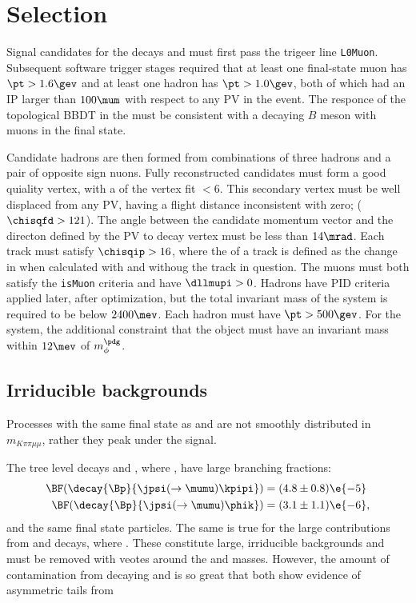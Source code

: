 \section{Selection}

Signal candidates for the decays \btokpipimumu and \btophikmumu must first pass the \lone trigeer
line {\tt L0Muon}.
Subsequent software trigger stages required that at least one final-state muon has $\pt>1.6\gev$
and at least one hadron has $\pt>1.0\gev$, both of which had an IP larger than $100\mum$ with
respect to any PV in the event.
The responce of the topological BBDT in the \hlttwo must be consistent with a decaying $B$ meson
with muons in the final state.


Candidate \Bp hadrons are then formed from combinations of three hadrons and a pair of opposite
sign nuons.
Fully reconstructed candidates must form a good quiality vertex, with a \chisq of the vertex fit
$<6$.
This secondary vertex must be well displaced from any PV, having a flight distance inconsistent
with zero; ($\chisqfd>121$).
The angle between the \Bp candidate momentum vector and the directon defined by the PV to \Bp decay
vertex must be less than $14\mrad$.
Each track must satisfy $\chisqip>16$, where the \chisqip of a track is defined as the change in
\chisqip when calculated with and withoug the track in question.
The muons must both satisfy the {\tt isMuon} criteria and have $\dllmupi>0$.
Hadrons have PID criteria applied later, after optimization, but the total invariant mass of the
\kpipi system is required to be below $2400\mev$.
Each hadron must have $\pt>500\gev$.
For the \phik system, the additional constraint that the \decay{\phi}{\kk} object must have an
invariant mass within $12\mev$ of $m_\phi^\pdg$.



\subsection{Irriducible backgrounds}

Processes with the same final state as \btokpipimumu and \btophikmumu are not smoothly distributed
in $m_{K\pi\pi\mu\mu}$, rather they peak under the signal.


The tree level decays \decay{\Bp}{\jpsi\kpipi} and \decay{\Bp}{\jpsi\phik}, where
\decay{\jpsi}{\mumu}, have large branching fractions:
\begin{align}
  \BF(\decay{\Bp}{\jpsi(\to\mumu)\kpipi}) &= (4.8 \pm 0.8)\e{-5} \\
  \BF(\decay{\Bp}{\jpsi(\to\mumu)\phik}) &= (3.1 \pm 1.1)\e{-6},
\end{align}
and the same final state particles.
The same is true for the large contributions from \decay{\Bp}{\psitwos\kpipi} and
\decay{\Bp}{\psitwos\phik} decays, where \decay{\psitwos}{\mumu}.
These constitute large, irriducible backgrounds and must be removed with veotes around the \jpsi
and \psitwos masses.
However, the amount of contamination from decaying \jpsi and \psitwos is so great that both show
evidence of asymmetric tails from


